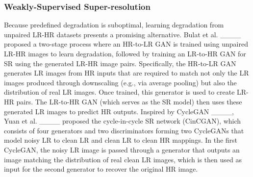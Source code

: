 \subsubsection{Weakly-Supervised Super-resolution}
Because predefined degradation is suboptimal, learning degradation from unpaired LR-HR datasets presents a promising alternative. Bulat et al. ____ proposed a two-stage process where an HR-to-LR GAN is trained using unpaired LR-HR images to learn degradation, followed by training an LR-to-HR GAN for SR using the generated LR-HR image pairs. Specifically, the HR-to-LR GAN generates LR images from HR inputs that are required to match not only the LR images produced through downscaling (e.g., via average pooling) but also the distribution of real LR images. Once trained, this generator is used to create LR-HR pairs. The LR-to-HR GAN (which serves as the SR model) then uses these generated LR images to predict HR outputs. Inspired by CycleGAN ____, Yuan et al. ____ proposed the cycle-in-cycle SR network (CinCGAN), which consists of four generators and two discriminators forming two CycleGANs that model noisy LR to clean LR and clean LR to clean HR mappings. In the first CycleGAN, the noisy LR image is passed through a generator that outputs an image matching the distribution of real clean LR images, which is then used as input for the second generator to recover the original HR image.

